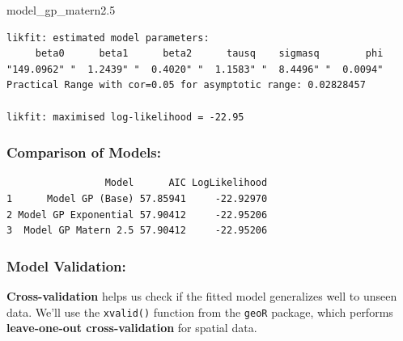 \documentclass[
  11pt,
]{article}
\newenvironment{Shaded}{\begin{snugshade}}{\end{snugshade}}
\newcommand{\FloatTok}[1]{\textcolor[rgb]{0.68,0.00,0.00}{#1}}
\newcommand{\NormalTok}[1]{\textcolor[rgb]{0.00,0.23,0.31}{#1}}
\begin{document}
\begin{Shaded}
\begin{Highlighting}[]
\NormalTok{model\_gp\_matern2}\FloatTok{.5}
\end{Highlighting}
\end{Shaded}

\begin{verbatim}
likfit: estimated model parameters:
     beta0      beta1      beta2      tausq    sigmasq        phi 
"149.0962" "  1.2439" "  0.4020" "  1.1583" "  8.4496" "  0.0094" 
Practical Range with cor=0.05 for asymptotic range: 0.02828457

likfit: maximised log-likelihood = -22.95
\end{verbatim}

\subsubsection{Comparison of Models:}\label{comparison-of-models}

\begin{verbatim}
                 Model      AIC LogLikelihood
1      Model GP (Base) 57.85941     -22.92970
2 Model GP Exponential 57.90412     -22.95206
3  Model GP Matern 2.5 57.90412     -22.95206
\end{verbatim}

\subsubsection{Model Validation:}\label{model-validation}

\textbf{Cross-validation} helps us check if the fitted model generalizes
well to unseen data. We'll use the \texttt{xvalid()} function from the
\texttt{geoR} package, which performs \textbf{leave-one-out
cross-validation} for spatial data.
\end{document}
